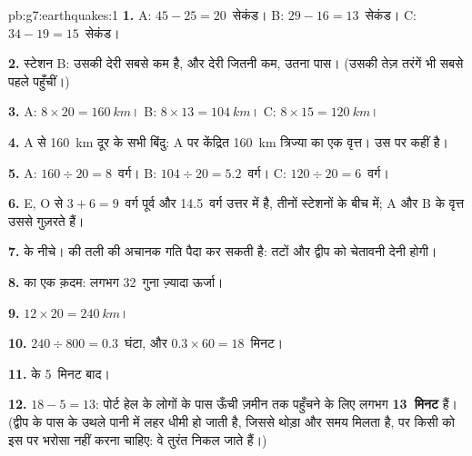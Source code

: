 \begin{solution}{pb:g7:earthquakes:1}
\textbf{1.} A: $45 - 25 = 20$~सेकंड। B: $29 - 16 = 13$~सेकंड। C: $34 - 19 =
15$~सेकंड।

\textbf{2.} स्टेशन B: उसकी देरी सबसे कम है, और देरी जितनी कम,  उतना पास।
(उसकी तेज़ तरंगें भी सबसे पहले पहुँचीं।)

\textbf{3.} A: $8 \times 20 = \qty{160}{km}$। B: $8 \times 13 =
\qty{104}{km}$। C: $8 \times 15 = \qty{120}{km}$।

\textbf{4.} A से \qty{160}{km} दूर के सभी बिंदु: A पर केंद्रित
\qty{160}{km} त्रिज्या का एक वृत्त।  उस पर कहीं है।

\textbf{5.} A: $160 \div 20 = 8$~वर्ग। B: $104 \div 20 = 5.2$~वर्ग।
C: $120 \div 20 = 6$~वर्ग।

\textbf{6.} E, O से $3 + 6 = 9$~वर्ग पूर्व और 14.5~वर्ग उत्तर में है, तीनों
स्टेशनों के बीच  में; A और B के वृत्त उससे गुज़रते हैं।

\textbf{7.}  के नीचे।  की तली की अचानक गति  पैदा कर सकती है:
तटों और द्वीप को चेतावनी देनी होगी।

\textbf{8.}  का एक क़दम: लगभग 32~गुना ज़्यादा ऊर्जा।

\textbf{9.} $12 \times 20 = \qty{240}{km}$।

\textbf{10.} $240 \div 800 = 0.3$~घंटा, और $0.3 \times 60 = 18$~मिनट।

\textbf{11.}  के 5~मिनट बाद।

\textbf{12.} $18 - 5 = 13$: पोर्ट हेल के लोगों के पास ऊँची ज़मीन तक पहुँचने के लिए
लगभग \textbf{13~मिनट} हैं। (द्वीप के पास के उथले पानी में लहर धीमी हो जाती है,
जिससे थोड़ा और समय मिलता है, पर किसी को इस पर भरोसा नहीं करना चाहिए: वे तुरंत
निकल जाते हैं।)
\end{solution}
